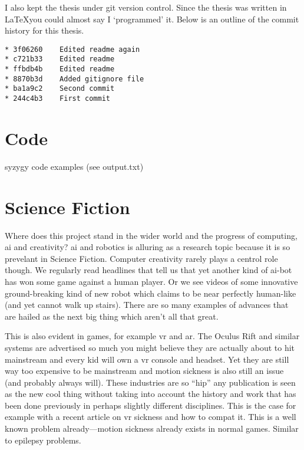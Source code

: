 \spirals

I also kept the thesis under git version control. Since the thesis was written in \LaTeX you could almost say I `programmed' it. Below is an outline of the commit history for this thesis.

\begin{verbatim}
* 3f06260	 Edited readme again
* c721b33	 Edited readme
* ffbdb4b	 Edited readme
* 8870b3d	 Added gitignore file
* ba1a9c2	 Second commit
* 244c4b3	 First commit
\end{verbatim}



\section{Code}
syzygy code examples (see output.txt)\\





\section{Science Fiction}

Where does this project stand in the wider world and the progress of computing, \gls{ai} and creativity? \gls{ai} and robotics is alluring as a research topic because it is so prevelant in Science Fiction. Computer creativity rarely plays a centrol role though. We regularly read headlines that tell us that yet another kind of \gls{ai}-bot has won some game against a human player. Or we see videos of some innovative ground-breaking kind of new robot which claims to be near perfectly human-like (and yet cannot walk up stairs). There are so many examples of advances that are hailed as the next big thing which aren't all that great. 

This is also evident in games, for example \gls{vr} and \gls{ar}. The Oculus Rift and similar systems are advertised so much you might believe they are actually about to hit mainstream and every kid will own a \gls{vr} console and headset. Yet they are still way too expensive to be mainstream and motion sickness is also still an issue (and probably always will). These industries are so ``hip'' any publication is seen as the new cool thing without taking into account the history and work that has been done previously in perhaps slightly different disciplines. This is the case for example with a recent article on \gls{vr} sickness and how to compat it. This is a well known problem already---motion sickness already exists in normal games. Similar to epilepsy problems.

